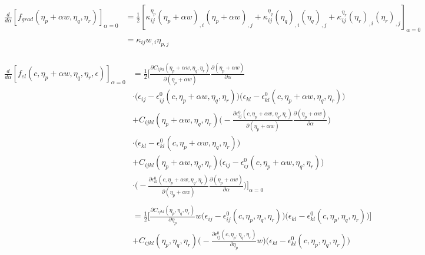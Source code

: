 \documentclass[11pt]{article}
\renewcommand{\=}[1]{\stackrel{#1}{=}} %
\theoremstyle{definition}
\theoremstyle{remark}
\begin{document}
\begin{align}
\begin{split}
\frac{d}{d\alpha} \left[ f_{grad}(\eta_p+\alpha w,\eta_q,\eta_r)\right]_{\alpha=0} &= \frac{1}{2} \left[ \kappa_{ij}^{\eta_p} (\eta_p+\alpha w)_{,i}(\eta_p+\alpha w)_{,j} +\kappa_{ij}^{\eta_q} (\eta_q)_{,i}(\eta_q)_{,j} + \kappa_{ij}^{\eta_r} (\eta_r)_{,i}(\eta_r)_{,j}  \right]_{\alpha=0} \\
\\
&= \kappa_{ij} w_{,i} \eta_{p,j}
\end{split}
\end{align}

\begin{align}
\begin{split}
\frac{d}{d\alpha} \left[ f_{el}(c,\eta_p+\alpha w,\eta_q,\eta_r,\epsilon)\right]_{\alpha=0} &= \frac{1}{2}  \bigg[  \frac{\partial C_{ijkl}(\eta_p+\alpha w,\eta_q,\eta_r)}{\partial (\eta_p + \alpha w)} \frac{\partial(\eta_p + \alpha w)}{\partial \alpha} \\ 
&\cdot\big (\epsilon_{ij}-\epsilon_{ij}^0 (c,\eta_p+\alpha w,\eta_q,\eta_r)\big) \big(\epsilon_{kl}-\epsilon_{kl}^0 (c,\eta_p+\alpha w,\eta_q,\eta_r)\big) \\
&+ C_{ijkl}(\eta_p+\alpha w,\eta_q,\eta_r) \bigg (-\frac{\partial\epsilon_{ij}^0 (c,\eta_p+\alpha w,\eta_q,\eta_r)}{\partial (\eta_p + \alpha w)} \frac{\partial(\eta_p + \alpha w)}{\partial \alpha} \bigg) \\ &\cdot \big(\epsilon_{kl}-\epsilon_{kl}^0 (c,\eta_p+\alpha w,\eta_q,\eta_r)\big) \\
&+ C_{ijkl}(\eta_p+\alpha w,\eta_q,\eta_r)   \big(\epsilon_{ij}-\epsilon_{ij}^0 (c,\eta_p+\alpha w,\eta_q,\eta_r)\big) \\ 
&\cdot\bigg (-\frac{\partial\epsilon_{kl}^0 (c,\eta_p+\alpha w,\eta_q,\eta_r)}{\partial (\eta_p + \alpha w)} \frac{\partial(\eta_p + \alpha w)}{\partial \alpha} \bigg)\bigg]_{\alpha=0} \\
\\
&= \frac{1}{2}  \bigg[  \frac{\partial C_{ijkl}(\eta_p,\eta_q,\eta_r)}{\partial \eta_p} w \big(\epsilon_{ij}-\epsilon_{ij}^0 (c,\eta_p,\eta_q,\eta_r) \big) \big(\epsilon_{kl}-\epsilon_{kl}^0 (c,\eta_p,\eta_q,\eta_r) \big) \bigg] \\
&+ C_{ijkl}(\eta_p,\eta_q,\eta_r) \bigg (-\frac{\partial\epsilon_{ij}^0 (c,\eta_p,\eta_q,\eta_r)}{\partial \eta_p} w \bigg) \big(\epsilon_{kl}-\epsilon_{kl}^0 (c,\eta_p,\eta_q,\eta_r)\big) \\
\end{split}
\end{align}
\end{document}
